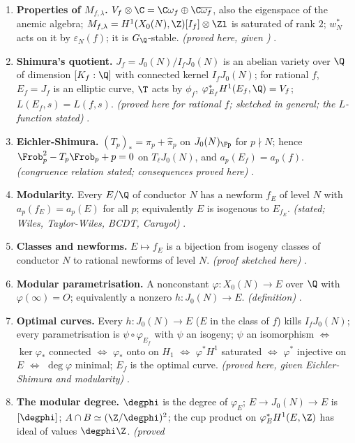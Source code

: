 \begin{enumerate}[label=\textbf{\thechapter.\arabic*}]
\item \textbf{Properties of $M_{f,\lambda}$.} $V_f\otimes\C=\C\omega_f\oplus\C\overline{\omega_f}$, also the eigenspace of the anemic algebra; $M_{f,\lambda}=H^1(X_0(N),\Z)[I_f]\otimes\Zl$ is saturated of rank $2$; $w_N^*$ acts on it by
$\varepsilon_N(f)$; it is $G_\Q$-stable. \emph{(proved here, given )} .
\item \textbf{Shimura's quotient.} $J_f=J_0(N)/I_fJ_0(N)$ is an abelian variety over $\Q$ of dimension $[K_f:\Q]$ with connected kernel $I_fJ_0(N)$; for rational $f$, $E_f=J_f$ is an elliptic curve, $\T$ acts by $\phi_f$,
$\varphi_{E_f}^*H^1(E_f,\Q)=V_f$; $L(E_f,s)=L(f,s)$. \emph{(proved here for rational $f$; sketched in general; the $L$-function stated)} .
\item \textbf{Eichler-Shimura.} $(T_p)_*=\pi_p+\hat\pi_p$ on $J_0(N)_{\Fp}$ for $p\nmid N$; hence $\Frob_p^2-T_p\Frob_p+p=0$ on $T_\ell J_0(N)$, and $a_p(E_f)=a_p(f)$. \emph{(congruence relation stated; consequences
proved here)} .
\item \textbf{Modularity.} Every $E/\Q$ of conductor $N$ has a newform $f_E$ of level $N$ with $a_p(f_E)=a_p(E)$ for all $p$; equivalently $E$ is isogenous to $E_{f_E}$. \emph{(stated; Wiles, Taylor-Wiles, BCDT,
Carayol)} .
\item \textbf{Classes and newforms.} $E\mapsto f_E$ is a bijection from isogeny classes of conductor $N$ to rational newforms of level $N$. \emph{(proof sketched here)} .
\item \textbf{Modular parametrisation.} A nonconstant $\varphi\colon X_0(N)\to E$ over $\Q$ with $\varphi(\infty)=O$; equivalently a nonzero $h\colon J_0(N)\to E$. \emph{(definition)} .
\item \textbf{Optimal curves.} Every $h\colon J_0(N)\to E$ ($E$ in the class of $f$) kills $I_fJ_0(N)$; every parametrisation is $\psi\circ\varphi_{E_f}$ with $\psi$ an isogeny; $\psi$ an isomorphism $\Leftrightarrow$ $\ker\varphi_*$
connected $\Leftrightarrow$ $\varphi_*$ onto on $H_1$ $\Leftrightarrow$ $\varphi^*H^1$ saturated $\Leftrightarrow$ $\varphi^*$ injective on $E$ $\Leftrightarrow$ $\deg\varphi$ minimal; $E_f$ is the optimal curve. \emph{(proved here,
given Eichler-Shimura and modularity)} .
\item \textbf{The modular degree.} $\degphi$ is the degree of $\varphi_E$; $E\to J_0(N)\to E$ is $[\degphi]$; $A\cap B\simeq(\Z/\degphi)^2$; the cup product on $\varphi_E^*H^1(E,\Z)$ has ideal of values $\degphi\Z$. \emph{(proved
}
\end{enumerate}
